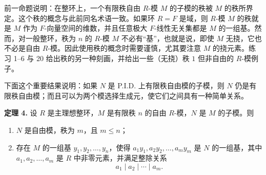 前一命题说明：在整环上，一个有限秩自由 $R$-模 $M$ 的子模的秩被 $M$ 的秩所界定。这个秩的概念与此前同名术语一致。如果环 $R=F$ 是域，则 $R$-模 $M$ 的秩就是 $M$ 作为 $F$-向量空间的维数，并且任意极大 $F$-线性无关集都是 $M$ 的一组基。然而，对一般整环，秩为 $n$ 的 $R$-模 $M$ 不必有“基”，也就是说，即使 $M$ 无挠，它也不必是自由 $R$-模。因此使用秩的概念时需要谨慎，尤其要注意 $M$ 的挠元素。练习 1--6 与 20 给出秩的另一种刻画，并给出一些（无挠）秩 $1$ 但非自由的 $R$-模例子。

下面这个重要结果说明：如果 $N$ 是 P.I.D. 上有限秩自由模的子模，则 $N$ 仍是有限秩自由模；而且可以为两个模选择生成元，使它们之间具有一种简单关系。

\noindent\textbf{定理 4.} 设 $R$ 是主理想整环，$M$ 是有限秩 $n$ 的自由 $R$-模，$N$ 是 $M$ 的子模。则
\begin{enumerate}[label=(\arabic*)]
\item $N$ 是自由模，秩为 $m$，且 $m\leq n$；
\item 存在 $M$ 的一组基 $y_1,y_2,\ldots,y_n$，使得 $a_1y_1,a_2y_2,\ldots,a_my_m$ 是 $N$ 的一组基，其中 $a_1,a_2,\ldots,a_m$ 是 $R$ 中非零元素，并满足整除关系
\[
a_1\mid a_2\mid\cdots\mid a_m.
\]
\end{enumerate}

